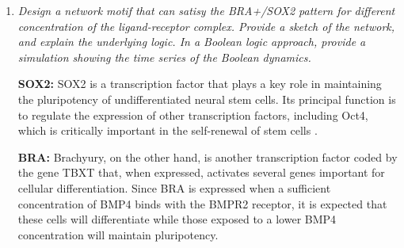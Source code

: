 \documentclass{article} %
\begin{document}
\begin{enumerate}
  \begin{align*}
    K_a &= \frac{K_{on}}{K_{off}} \\
    [RL] &= K_a[R][L] \\
    \intertext{$L$ at $x=\lambda$:}
    L &= \frac{L_0}{e} \\ 
        &= \frac{\SI{2}{\nano\g\per\micro\m}}{e} \\
        &= \SI{0.74}{\nano\g\per\micro\m} \\
    \intertext{$R$ at $x=\lambda$:}
    R &= \frac{\alpha L}{k_R} \\
        &= \frac{\SI{5e-3}{\per\s}\cdot \SI{0.74}{\nano\g\per\micro\m}}{\SI{10e-3}{\per\s}} \quad \text{(from above)} \\
        &= \SI{0.37}{\nano\g\per\micro\m}
          \intertext{It follows that:}
          [RL] &= K_a\cdot\SI{0.74}{\nano\g\per\micro\m}\cdot\SI{0.37}{\nano\g\per\micro\m} \\
        &= \SI{0.27}{\nano\g^2\per\micro\m^2}\cdot K_a
  \end{align*}

  The concentration of the ligand-receptor complex $RL$--- subsequently denoted $C$---at $x=\lambda$ is therefore dependant on the association constant $K_a$.
  \item \textit{Design a network motif that can satisy the BRA+/SOX2 pattern for different concentration of the ligand-receptor complex. Provide a sketch of the network, and explain the underlying logic. In a Boolean logic approach, provide a simulation showing the time series of the Boolean dynamics.}

    \textbf{SOX2:}
    SOX2 is a transcription factor that plays a key role in maintaining the pluripotency of undifferentiated neural stem cells. Its principal function is to regulate the expression of other transcription factors, including Oct4, which is critically important in the self-renewal of stem cells \parencite{chambers2009transcriptional}.

    \textbf{BRA:} Brachyury, on the other hand, is another transcription factor coded by the gene TBXT that, when expressed, activates several genes important for cellular differentiation. Since BRA is expressed when a sufficient concentration of BMP4 binds with the BMPR2 receptor, it is expected that these cells will differentiate while those exposed to a lower BMP4 concentration will maintain pluripotency.


\end{enumerate}
\end{document}

